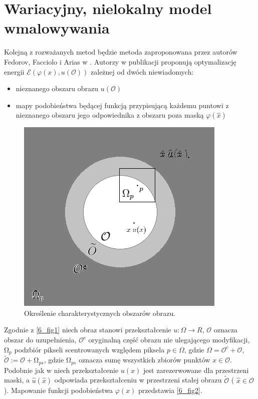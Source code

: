 \documentclass[12pt, twoside, openany]{report}
\theoremstyle{definition}
\begin{document}
\section{Wariacyjny, nielokalny model wmalowywania}
Kolejną z rozważanych metod będzie metoda zaproponowana przez autorów Fedorov, Facciolo i Arias w \cite{arias2011variational}. Autorzy w publikacji proponują optymalizację energii $\mathcal{E}(\varphi(x), u(\mathcal{O}))$ zależnej od dwóch niewiadomych:
\begin{itemize}
\item
nieznanego obszaru obrazu $u(\mathcal{O})$
\item
mapy podobieństwa będącej funkcją przypisującą każdemu puntowi z nieznanego obszaru jego odpowiednika z obszaru poza maską $\varphi(\hat{x})$
\end{itemize}
\begin{figure}[!h]
	\centering
	\includegraphics[scale=0.9]{rysunki/6_fig1}
	\caption{Określenie charakterystycznych obszarów obrazu.}
	\label{6_fig1}
\end{figure}
Zgodnie z \autoref{6_fig1} niech obraz stanowi przekształcenie $ u : {\Omega} \rightarrow R$, $\mathcal{O}$ oznacza obszar do uzupełnienia, $\mathcal{O}^c$ oryginalną część obrazu nie ulegającego modyfikacji, $\mathrm{\Omega }_p$ podzbiór pikseli scentrowanych względem  piksela $p \in \Omega$, gdzie $\Omega = \mathcal{O}^c + \mathcal{O}$, $\widetilde{\mathcal{O}} := \mathcal{O} + \mathrm{\Omega }_{ps}$, gdzie $\mathrm{\Omega }_{ps}$ oznacza sumę wszystkich zbiorów punktów $x \in \mathcal{O}$. Podobnie jak w \cite{arias2011variational} niech przekształcenie $u(x)$ jest zarezerwowane dla przestrzeni maski, a $\hat{u}(\hat{x})$ odpowiada przekształceniu w przestrzeni stałej obrazu $\widetilde{\mathcal{O}}$ ( $\hat{x} \in \mathcal{O}$). Mapowanie funkcji podobieństwa $\varphi(x)$ przedstawia \autoref{6_fig2}.
\end{document}

